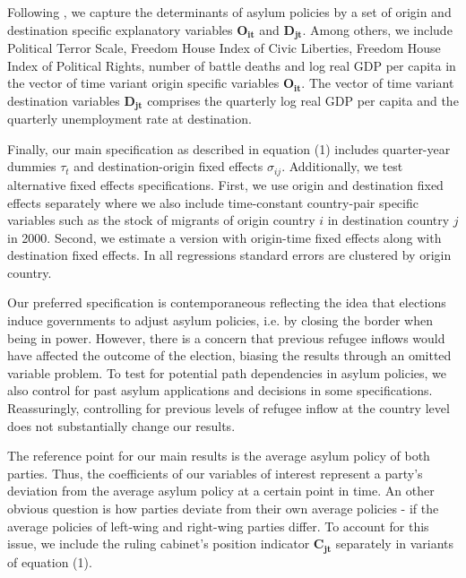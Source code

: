\documentclass[a4paper,12pt]{article}
\begin{document}
Following \cite{hatton2016}, we capture the determinants of asylum policies by a set of origin and destination specific explanatory variables $\mathbf{O_{it}}$ and $\mathbf{D_{jt}}$. Among others,
 we include Political Terror Scale, Freedom House Index of Civic Liberties, Freedom House Index of  Political Rights, number of battle deaths and log real GDP per capita in the vector of time variant origin specific variables $\mathbf{O_{it}}$. The vector of time variant destination variables $\mathbf{D_{jt}}$ comprises the quarterly log real GDP per capita and the quarterly unemployment rate at destination. 
 
Finally, our main specification as described in equation (1) includes quarter-year dummies $\tau_t$ and destination-origin fixed effects $\sigma_{ij}$. Additionally, we test alternative fixed effects specifications. First, we use origin and destination fixed effects separately where we also include time-constant country-pair specific variables such as the stock of migrants of origin country $i$ in destination country $j$ in 2000. Second, we estimate a version with origin-time fixed effects along with destination fixed effects. In all regressions standard errors are clustered by origin country.

Our preferred specification is contemporaneous reflecting the idea that elections induce governments to adjust asylum policies, i.e. by closing the border when being in power. However, there is a concern that previous refugee inflows would have affected the outcome of the election, biasing the results through an omitted variable problem. To test for potential path dependencies in asylum policies, we also control for past asylum applications and decisions in some specifications. Reassuringly, controlling for previous levels of refugee inflow at the country level does not substantially change our results. 

The reference point for our main results is the average asylum policy of both parties. Thus, the coefficients of our variables of interest represent a party's deviation from the average asylum policy at a certain point in time. An other obvious question is how parties deviate from their own average policies - if the average policies of left-wing and right-wing parties differ. To account for this issue, we include the ruling cabinet's position indicator $\mathbf{C_{jt}}$ separately in variants of equation (1).
\end{document}

